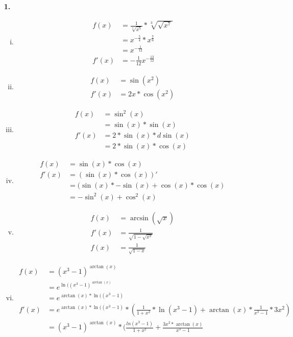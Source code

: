 \documentclass[a4paper]{scrartcl}
\title{\titleinfo}
\author{Elena Noll, Sven-Hendrik Haase, Arne Struck}
\date{\today}
\begin{document}
\maketitle

\begin{enumerate}

\item[\textbf{1.}]
\begin{enumerate}[(i)]

\item
\begin{align}
f(x) &= \frac{1}{\sqrt[4]{x^5}} * \sqrt[3]{\sqrt{x^7}} \\
&= x^{-\frac{5}{4}} * x^{\frac{7}{6}}\\
&= x^{-\frac{1}{12}}\\  	 
f'(x) &= -\frac{1}{12} x^{-\frac{13}{12}}
\end{align}
\item
\begin{align}
f(x) &= \sin(x^2) \\
f'(x)&= 2x*\cos(x^2)
\end{align}
\item
\begin{align}
f(x) &= \sin^2(x) \\
&= \sin(x)*\sin(x) \\
f'(x) &= 2*\sin(x)*d \sin(x)\\
&= 2*\sin(x)*\cos(x)
\end{align}
\item
\begin{align}
f(x) &= \sin(x)*\cos(x)\\
f'(x) &= (\sin(x)*\cos(x))'\\
&= (\sin(x)*-\sin(x)+\cos(x)*\cos(x)\\
&= -\sin^2(x)+\cos^2(x)
\end{align}
\item
\begin{align}
f(x) &= \arcsin(\sqrt{x}) \\
f'(x) &= \frac{1}{\sqrt{1-\sqrt{x^2}}} \\
f(x) &= \frac{1}{\sqrt{1-x}}
\end{align}
\item
\begin{align}
f(x) &= (x^3-1)^{\arctan(x)} \\
&= e^{\ln((x^3-1)^{\arctan (x)}} \\
&= e^{{\arctan (x)}*\ln((x^3-1)}\\
f'(x) &= e^{{\arctan (x)}*\ln((x^3-1)} * (\frac{1}{1+x^2}*\ln(x^3-1)+\arctan(x)*\frac{1}{x^3-1}*3x^2)\\
&= (x^3-1)^{\arctan(x)}*(\frac{ln(x^3-1)}{1+x^2}+\frac{3x^2*\arctan(x)}{x^3-1}
\end{align}
\end{enumerate}



\end{enumerate}
\end{document}
